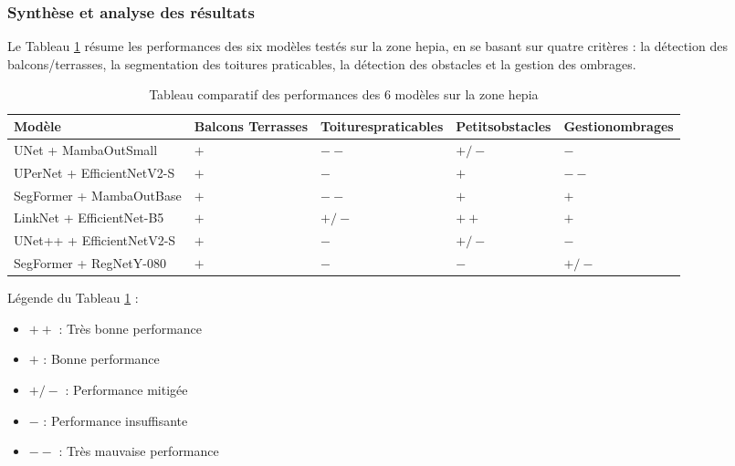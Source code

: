 
\subsubsection{Synthèse et analyse des résultats}

Le Tableau \ref{tab:quartier_hepia_comparatif_modeles} résume les performances des six modèles testés sur la zone \acrshort{hepia}, en se basant sur quatre critères : la détection des balcons/terrasses, la segmentation des toitures praticables, la détection des obstacles et la gestion des ombrages.

\begin{table}[H]
\centering
\begin{tabularx}{\textwidth}{|l|X|X|X|X|}
\hline
Modèle & {Balcons \newline Terrasses} & {Toitures\newline praticables} & {Petits\newline obstacles} & {Gestion\newline ombrages} \\
\hline
UNet + MambaOutSmall & $+$ & $--$ & $+/-$ & $-$ \\
\hline
UPerNet + EfficientNetV2-S & $+$ & $-$ & $+$ & $--$ \\
\hline
SegFormer + MambaOutBase & $+$ & $--$ & $+$ & $+$ \\
\hline
LinkNet + EfficientNet-B5 & $+$ & $+/-$ & $++$ & $+$ \\
\hline
UNet++ + EfficientNetV2-S & $+$ & $-$ & $+/-$ & $-$ \\
\hline
SegFormer + RegNetY-080 & $+$ & $-$ & $-$ & $+/-$ \\
\hline
\end{tabularx}
\caption{Tableau comparatif des performances des 6 modèles sur la zone \acrshort{hepia}}
\label{tab:quartier_hepia_comparatif_modeles}
\end{table}

Légende du Tableau \ref{tab:quartier_hepia_comparatif_modeles} :
\begin{itemize}[label={}]
\item $++$ : Très bonne performance
\item $+$ : Bonne performance
\item $+/-$ : Performance mitigée
\item $-$ : Performance insuffisante
\item $--$ : Très mauvaise performance
\end{itemize}

